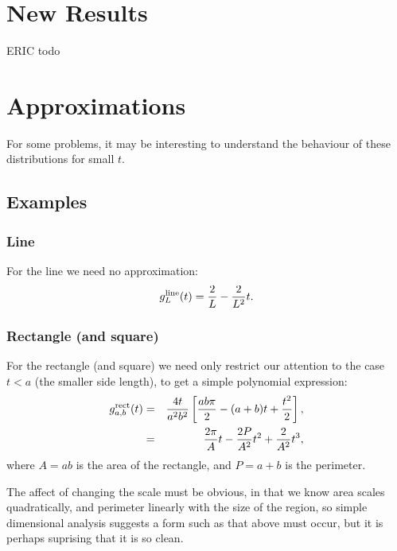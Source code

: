 \documentclass{article}
\begin{document}

\section{New Results}

ERIC todo


 
\section{Approximations}

For some problems, it may be interesting to understand the behaviour
of these distributions for small $t$. 

\subsection{Examples}

\subsubsection{Line}
For the line we need no approximation:
\begin{equation}
  \label{eq:line_line}
  g^{\rm line}_L(t) = \frac{2}{L} - \frac{2}{L^2} t.
\end{equation}

\subsubsection{Rectangle (and square)}
For the rectangle (and square) we need only restrict our attention to
the case $t<a$ (the smaller side length), to get a simple polynomial
expression: 
\begin{eqnarray}
  g^{\rm rect}_{a,b}(t) & = & 
           \frac{4 t}{a^2 b^2}  
         \left[ \frac{ab \pi}{2} - (a+b) t + \frac{t^2}{2} \right],
          \nonumber \\
                         & = & \frac{2 \pi}{A} t 
                              - \frac{2 P}{A^2} t^2
                              + \frac{2}{A^2} t^3,
\end{eqnarray}
where $A = ab$ is the area of the rectangle, and $P = a+b$ is the perimeter.

The affect of changing the scale must be obvious, in that we know area
scales quadratically, and perimeter linearly with the size of the
region, so simple dimensional analysis suggests a form such as that
above must occur, but it is perhaps suprising that it is so clean. 
\end{document}
